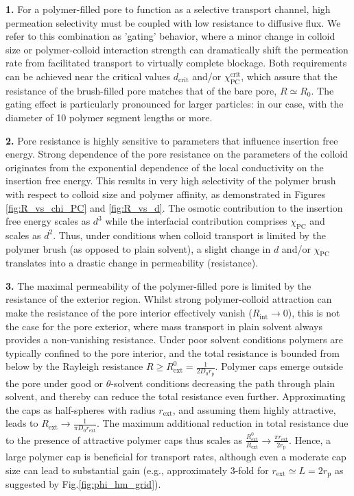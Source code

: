 \documentclass[12pt, a4paper]{article}
\begin{document}
\bigskip


\textbf{1.}
For a polymer-filled pore to function as a selective transport channel, high permeation selectivity must be coupled with low resistance to diffusive flux.
We refer to this combination as 'gating' behavior, where a minor change in colloid size or polymer-colloid interaction strength can dramatically shift the permeation rate from facilitated transport to virtually complete blockage.
Both requirements can be achieved near the critical values $d_{\text{crit}}$ and/or $\chi_{\text{PC}}^{\text{crit}}$, which assure that the resistance of the brush-filled pore matches that of the bare pore, $R\simeq R_{0}$.
The gating effect is particularly pronounced for larger particles: in our case, with the diameter of 10 polymer segment lengths or more.

\textbf{2.}
Pore resistance is highly sensitive to parameters that influence insertion free energy.
Strong dependence of the pore resistance on the parameters of the colloid originates from the exponential dependence of the local conductivity on the insertion free energy.
This results in very high selectivity of the polymer brush with respect to colloid size and polymer affinity, as demonstrated in Figures \ref{fig:R_vs_chi_PC} and \ref{fig:R_vs_d}.
The osmotic contribution to the insertion free energy scales as $d^3$ while the interfacial contribution comprises $\chi_{\text{PC}}$ and scales as $d^2$.
Thus, under conditions when colloid transport is limited by the polymer brush (as opposed to plain solvent), a slight change in $d$ and/or $\chi_{\text{PC}}$ translates into a drastic change in permeability (resistance).

\textbf{3.}
The maximal permeability of the polymer-filled pore is limited by the resistance of the exterior region.
Whilst strong  polymer-colloid attraction can make the resistance of the pore interior effectively vanish ($R_{\text{int}} \to 0$), this is not the case for the pore exterior, where mass transport in plain solvent always provides a non-vanishing resistance.
Under poor solvent conditions  polymers are typically confined to the pore interior, and the total resistance is bounded from below by the Rayleigh resistance  $R \geq R_{\text{ext}}^{0} = \frac{1}{2 D_0 r_{\text{p}}}$.
Polymer caps emerge outside the pore under good or $\theta$-solvent conditions decreasing the path through plain solvent, and thereby can reduce the total resistance even further. Approximating the caps as half-spheres with radius $r_{\text{ext}}$, and assuming them highly attractive, leads to $R_{\text{ext}} \to \frac{1}{ \pi D_0 r_{\text{ext}}}$.
The maximum additional reduction in total resistance due to the presence of attractive polymer caps thus scales as $\frac{R_{\text{ext}}^{0}}{R_{\text{ext}}} \to \frac{\pi r_{\text{ext}}}{2 r_{\text{p}}}$.
Hence, a large polymer cap is beneficial for transport rates, although even a moderate cap size can lead to substantial gain (e.g., approximately 3-fold for $r_{\text{ext}}\simeq L = 2r_{\text{p}}$ as suggested by Fig.\ref{fig:phi_hm_grid}).
\end{document}
